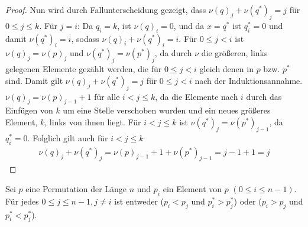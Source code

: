 \documentclass[a4paper, 10pt, ngerman]{article}
\begin{document}
\begin{proof}
    Nun wird durch Fallunterscheidung gezeigt, dass $\nu(q)_j + \nu(q^*)_j = j$ für $0 \le j \le k$. Für $j = i$: Da $q_i = k$, ist $\nu(q)_i = 0$, und da $x = q^*$ ist $q^*_i = 0$ und damit $\nu(q^*)_i = i$, sodass $\nu(q)_i + \nu(q^*)_i = i$. Für $0 \le j < i$ ist $\nu(q)_j = \nu(p)_j$ und $\nu(q^*)_j = \nu(p^*)_j$, da durch $\nu$ die größeren, links gelegenen Elemente gezählt werden, die für $0 \le j < i$ gleich denen in $p$ bzw. $p^*$ sind. Damit gilt $\nu(q)_j + \nu(q^*)_j = j$ für $0 \le j < i$ nach der Induktionsannahme. $\nu(q)_j = \nu(p)_{j - 1} + 1$ für alle $i < j \le k$, da die Elemente nach $i$ durch das Einfügen von $k$ um eine Stelle verschoben wurden und ein neues größeres Element, $k$, links von ihnen liegt. Für $i < j \le k$ ist $\nu(q^*)_j = \nu(p^*)_{j-1}$, da $q^*_i = 0$. Folglich gilt auch für $i < j \le k$
    \begin{align*}
        \nu(q)_j + \nu(q^*)_j = \nu(p)_{j - 1} + 1 + \nu(p^*)_{j - 1} = j - 1 + 1 = j 
    \end{align*}
\end{proof}

\begin{lemma}
    Sei $p$ eine Permutation der Länge $n$ und $p_i$ ein Element von $p$ $(0 \le i \le n - 1)$. Für jedes $0 \le j \le n-1, j \ne i$ ist entweder ($p_i < p_j$ und $p^*_i > p^*_j$) oder ($p_i > p_j$ und $p^*_i < p^*_j$).
\end{lemma}
\end{document}
